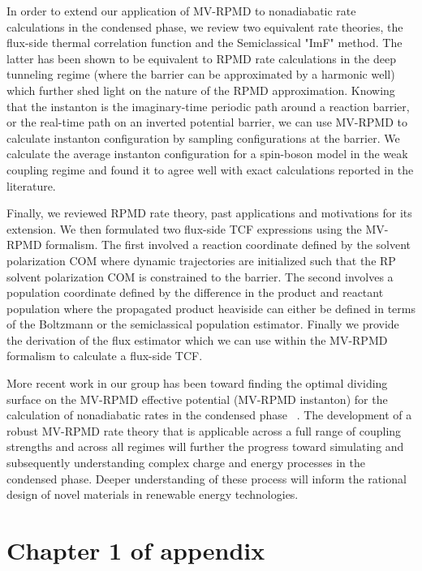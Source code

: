 \documentclass[phd,tocprelim]{cornell}
\begin{document}
In order to extend our application of MV-RPMD to nonadiabatic rate calculations in the condensed phase, we review two equivalent rate theories, the flux-side thermal correlation function and the Semiclassical "ImF" method. The latter has been shown to be equivalent to RPMD rate calculations in the deep tunneling regime (where the barrier can be approximated by a harmonic well) which further shed light on the nature of the RPMD approximation. Knowing that the instanton is the imaginary-time periodic path around a reaction barrier, or the real-time path on an inverted potential barrier, we can use MV-RPMD to calculate instanton configuration by sampling configurations at the barrier. We calculate the average instanton configuration for a spin-boson model in the weak coupling regime and found it to agree well with exact calculations reported in the literature. 

Finally, we reviewed RPMD rate theory, past applications and motivations for its extension. We then formulated two flux-side TCF expressions using the MV-RPMD formalism. The first involved a reaction coordinate defined by the solvent polarization COM where  dynamic trajectories are initialized such that the RP solvent polarization COM is constrained to the barrier. The second involves a population coordinate defined by the difference in the product and reactant population where the propagated product heaviside can either be defined in terms of the Boltzmann or the semiclassical population estimator. Finally we provide the derivation of the flux estimator which we can use within the MV-RPMD formalism to calculate a flux-side TCF. 


More recent work in our group has been toward finding the optimal dividing surface on the MV-RPMD effective potential (MV-RPMD instanton) for the calculation of nonadiabatic rates in the condensed phase ~\cite{SRINANTH18}. The development of a robust MV-RPMD rate theory that is applicable across a full range of coupling strengths and across all regimes will further the progress toward simulating and subsequently understanding complex charge and energy processes in the condensed phase. Deeper understanding of these process will inform the rational design of novel materials in renewable energy technologies. 
 

\appendix

\chapter{Chapter 1 of appendix}
\end{document}

